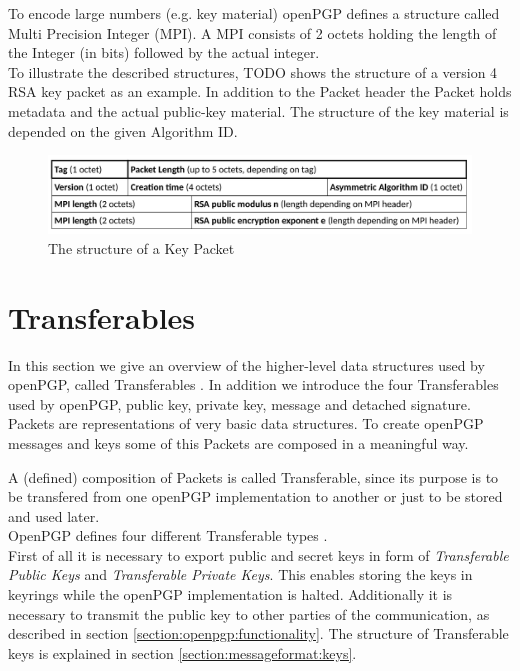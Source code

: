 To encode large numbers (e.g. key material) openPGP defines a structure called Multi Precision Integer (MPI). A MPI consists of 2 octets holding the length of the Integer (in bits) followed by the actual integer. \\


To illustrate the described structures, TODO shows the structure of a version 4 RSA key packet as an example. In addition to the Packet header the Packet holds metadata and the actual public-key material. The structure of the key material is depended on the given Algorithm ID.

\begin{figure}[h!]
\centering
\includegraphics[width=1\linewidth]{figures/packet-key.png}
\caption[]{The structure of a Key Packet}
\label{fig:packet-key}
\end{figure}


\section{Transferables}
\label{section:messageformat:transferables}

In this section we give an overview of the higher-level data structures used by openPGP, called Transferables \cite[section 11]{RFC4880}. In addition we introduce the four Transferables used by openPGP, public key, private key, message and detached signature.  \\

Packets are representations of very basic data structures. To create openPGP messages and keys some of this Packets are composed in a meaningful way.

A (defined) composition of Packets is called Transferable, since its purpose is to be transfered from one openPGP implementation to another or just to be stored and used later. \\

OpenPGP defines four different Transferable types \cite[section 11]{RFC4880}. \\

First of all it is necessary to export public and secret keys in form of \textit{Transferable Public Keys} and \textit{Transferable Private Keys}. This enables storing the keys in keyrings while the openPGP implementation is halted. Additionally it is necessary to transmit the public key to other parties of the communication, as described in section \ref{section:openpgp:functionality}. The structure of Transferable keys is explained in section \ref{section:messageformat:keys}.  \\

